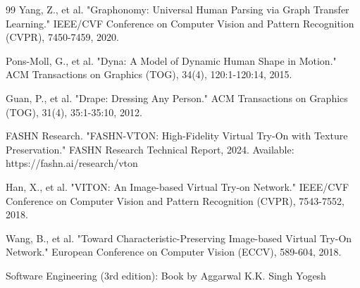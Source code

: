 \documentclass[12pt,a4paper,oneside]{report}
\begin{document}
\begin{thebibliography}{99}
 Yang, Z., et al. "Graphonomy: Universal Human Parsing via Graph Transfer Learning." IEEE/CVF Conference on Computer Vision and Pattern Recognition (CVPR), 7450-7459, 2020.

 Pons-Moll, G., et al. "Dyna: A Model of Dynamic Human Shape in Motion." ACM Transactions on Graphics (TOG), 34(4), 120:1-120:14, 2015.

 Guan, P., et al. "Drape: Dressing Any Person." ACM Transactions on Graphics (TOG), 31(4), 35:1-35:10, 2012.

 FASHN Research. "FASHN-VTON: High-Fidelity Virtual Try-On with Texture Preservation." FASHN Research Technical Report, 2024. Available: https://fashn.ai/research/vton

 Han, X., et al. "VITON: An Image-based Virtual Try-on Network." IEEE/CVF Conference on Computer Vision and Pattern Recognition (CVPR), 7543-7552, 2018.

 Wang, B., et al. "Toward Characteristic-Preserving Image-based Virtual Try-On Network." European Conference on Computer Vision (ECCV), 589-604, 2018.

 Software Engineering (3rd edition): Book by Aggarwal K.K. Singh Yogesh




\end{thebibliography}
\end{document}
